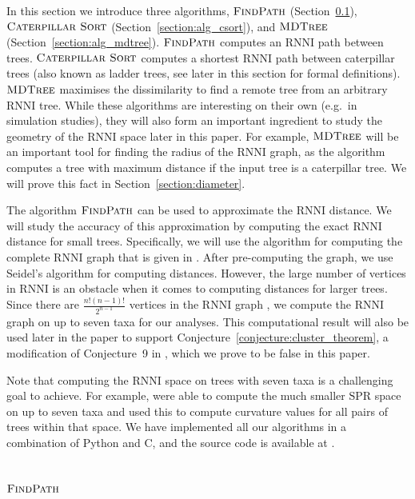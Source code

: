 \documentclass{amsart}
\newcommand{\rnni}{\mathrm{RNNI}}
\newcommand{\spr}{\mathrm{SPR}}
\newcommand{\csort}{\textsc{Caterpillar Sort}}
\newcommand{\findpath}{\textsc{FindPath}}
\newcommand{\mdtree}{\textsc{MDTree}}
\begin{document}
In this section we introduce three algorithms, $\findpath$ (Section~\ref{section:alg_findpath}), $\csort$ (Section~\ref{section:alg_csort}), and $\mdtree$ (Section~\ref{section:alg_mdtree}).
$\findpath$ computes an $\rnni$ path between trees.
$\csort$ computes a shortest $\rnni$ path between caterpillar trees (also known as ladder trees, see later in this section for formal definitions).
$\mdtree$ maximises the dissimilarity to find a remote tree from an arbitrary $\rnni$ tree.
While these algorithms are interesting on their own (e.g.\ in simulation studies), they will also form an important ingredient to study the geometry of the $\rnni$ space later in this paper.
For example, $\mdtree$ will be an important tool for finding the radius of the $\rnni$ graph, as the algorithm computes a tree with maximum distance if the input tree is a caterpillar tree.
We will prove this fact in Section~\ref{section:diameter}.

The algorithm $\findpath$ can be used to approximate the $\rnni$ distance.
We will study the accuracy of this approximation by computing the exact $\rnni$ distance for small trees.
Specifically, we will use the algorithm for computing the complete $\rnni$ graph that is given in \autocite[Section 3.3]{Gavryushkin2018-ol}.
After pre-computing the graph, we use Seidel's algorithm \autocite{seidel_all-pairs-shortest-path_1995} for computing distances.
However, the large number of vertices in $\rnni$ is an obstacle when it comes to computing distances for larger trees.
Since there are $\frac{n!(n-1)!}{2^{n-1}}$ vertices in the $\rnni$ graph \autocite{Gavryushkin2018-ol}, we compute the $\rnni$ graph on up to seven taxa for our analyses.
This computational result will also be used later in the paper to support Conjecture~\ref{conjecture:cluster_theorem}, a modification of Conjecture~9 in \autocite{Gavryushkin2018-ol}, which we prove to be false in this paper.

Note that computing the $\rnni$ space on trees with seven taxa is a challenging goal to achieve.
For example, \textcite{Whidden2016-kl} were able to compute the much smaller $\spr$ space on up to seven taxa and used this to compute curvature values for all pairs of trees within that space.
We have implemented all our algorithms in a combination of Python and C, and the source code is available at \autocite{Collienne2019}.


\subsection{$\findpath$}
\label{section:alg_findpath}
\end{document}
